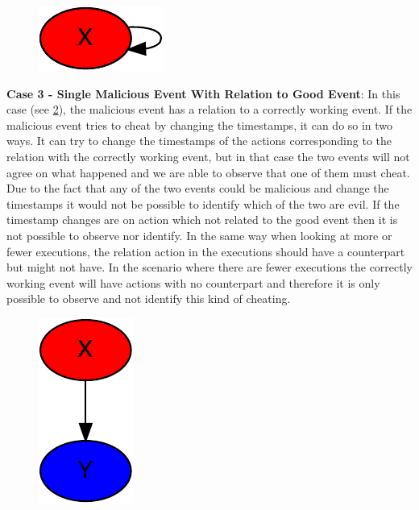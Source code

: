 	\begin{figure}[H]
		\centering
		\includegraphics[]{5validation/images/5.pdf}
		\caption{}
		\label{fig:consensus:single-malicious-with-relation}
	\end{figure}
	
	\newpar \textbf{Case 3 - Single Malicious Event With Relation to Good Event}: In this case (see \ref{fig:consensus:single-malicious-with-good-relation}), the malicious event has a relation to a correctly working event. If the malicious event tries to cheat by changing the timestamps, it can do so in two ways. It can try to change the timestamps of the actions corresponding to the relation with the correctly working event, but in that case the two events will not agree on what happened and we are able to observe that one of them must cheat. Due to the fact that any of the two events could be malicious and change the timestamps it would not be possible to identify which of the two are evil.
	If the timestamp changes are on action which not related to the good event then it is not possible to observe nor identify. 
	In the same way when looking at more or fewer executions, the relation action in the executions should have a counterpart but might not have. In the scenario where there are fewer executions the correctly working event will have actions with no counterpart and therefore it is only possible to observe and not identify this kind of cheating. 
	
	\begin{figure}[H]
		\centering
		\includegraphics[]{5validation/images/3.pdf}
		\caption{}
		\label{fig:consensus:single-malicious-with-good-relation}
	\end{figure}
	
